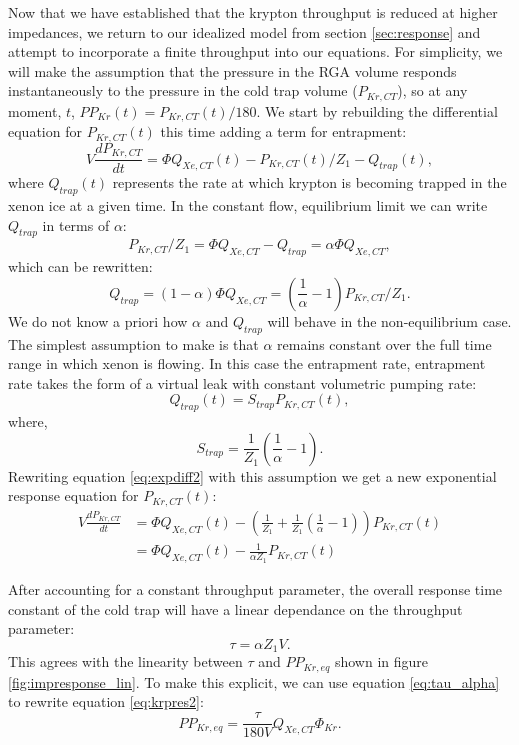 Now that we have established that the krypton throughput is reduced at higher impedances, we return to our idealized model from section \ref{sec:response} and attempt to incorporate a finite throughput into our equations. For simplicity, we will make the assumption that the pressure in the RGA volume responds instantaneously to the pressure in the cold trap volume ($P_{Kr,CT}$), so at any moment, $t$, $PP_{Kr}(t)=P_{Kr,CT}(t)/180$. We start by rebuilding the differential equation for $P_{Kr,CT}(t)$ this time adding a term for entrapment:
\begin{equation}
\label{eq:expdiff2}
V\frac{dP_{Kr,CT}}{dt}=\Phi Q_{Xe,CT}(t)-P_{Kr,CT}(t)/Z_1-Q_{trap}(t),
\end{equation}
where $Q_{trap}(t)$ represents the rate at which krypton is becoming trapped in the xenon ice at a given time. In the constant flow, equilibrium limit we can write $Q_{trap}$ in terms of $\alpha$:
\begin{equation}
P_{Kr,CT}/Z_1= \Phi Q_{Xe,CT}-Q_{trap}=\alpha \Phi Q_{Xe,CT},
\end{equation}
which can be rewritten:
\begin{equation}
Q_{trap}=(1-\alpha )\Phi Q_{Xe,CT}=(\frac{1}{\alpha}-1)P_{Kr,CT}/Z_1.
\end{equation}
We do not know a priori how $\alpha$ and $Q_{trap}$ will behave in the non-equilibrium case. The simplest assumption to make is that $\alpha$ remains constant over the full time range in which xenon is flowing. In this case the entrapment rate, entrapment rate takes the form of a virtual leak with constant volumetric pumping rate: 
\begin{equation}
Q_{trap}(t) = S_{trap}P_{Kr,CT}(t),
\end{equation}
where,
\begin{equation}
\label{eq:strap}
S_{trap}=\frac{1}{Z_1}(\frac{1}{\alpha}-1).
\end{equation}
Rewriting equation \ref{eq:expdiff2} with this assumption we get a new exponential response equation for $P_{Kr,CT}(t)$:
\begin{align}
 \label{eq:expdiff3}
V\frac{dP_{Kr,CT}}{dt}&=\Phi Q_{Xe,CT}(t)-(\frac{1}{Z_1}+\frac{1}{Z_1}(\frac{1}{\alpha}-1))P_{Kr,CT}(t)\\
&=\Phi Q_{Xe,CT}(t)-\frac{1}{\alpha Z_1}P_{Kr,CT}(t)
\end{align}

After accounting for a constant throughput parameter, the overall response time constant of the cold trap will have a linear dependance on the throughput parameter:
\begin{equation}
\label{eq:tau_alpha}
\tau=\alpha Z_1 V.
\end{equation}
This agrees with the linearity between $\tau$ and $PP_{Kr,eq}$ shown in figure \ref{fig:impresponse_lin}. To make this explicit, we can use equation \ref{eq:tau_alpha} to rewrite equation \ref{eq:krpres2}:
\begin{equation}
\label{eq:krpres3}
PP_{Kr,eq}=\frac{\tau}{180V}Q_{Xe,CT}\Phi_{Kr}.
\end{equation}

